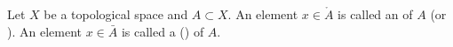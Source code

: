 Let $X$ be a topological space and $A \subset X$. An element $x \in \mathring{A}$ is called an  of $A$ (or ). An element $x \in \bar{A}$ is called a  () of $A$.
